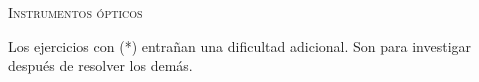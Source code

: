 \documentclass[11pt, spanish, a4paper, twoside]{article}
\begin{document}
\begin{center}
	\textsc{\LARGE Instrumentos ópticos}
\end{center}

Los ejercicios con (*) entrañan una dificultad adicional. Son para investigar después de resolver los demás.


\begin{enumerate}







\end{enumerate}
\end{document}
